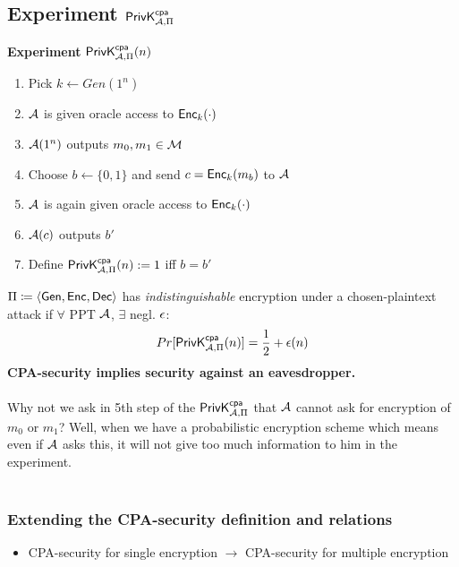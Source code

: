 \documentclass[12pt]{article}
\begin{document}
\subsection{ Experiment $\mathsf{PrivK}_{\mathcal{A},\Pi}^\mathsf{cpa}$}
\textbf{Experiment} $\mathsf{PrivK}_{\mathcal{A},\Pi}^\mathsf{cpa}(n)$
\begin{enumerate}
\item Pick $k \leftarrow Gen(1^n)$ 

\item $\mathcal{A}$ is given oracle access to $\operatorname{\mathsf{Enc}}_k(\cdot)$

\item $\mathcal{A}(1^n)$ outputs $m_0,m_1 \in \mathcal{M}$

\item Choose $b \leftarrow \{0,1\}$ and send $c = \operatorname{\mathsf{Enc}}_k(m_b)$ to $\mathcal{A}$

\item $\mathcal{A}$ is again given oracle access to $\operatorname{\mathsf{Enc}}_k(\cdot)$

 \item $\mathcal{A}(c)$ outputs $b'$

 \item Define $\mathsf{PrivK}_{\mathcal{A},\Pi}^\mathsf{cpa}(n):=1$ iff $b=b'$

\end{enumerate}
$\Pi \coloneqq \langle \operatorname{\mathsf{Gen}}, \operatorname{\mathsf{Enc}}, \operatorname{\mathsf{Dec}} \rangle $ has \emph{indistinguishable} encryption under a chosen-plaintext attack if $\forall$ PPT $\mathcal{A}$, $\exists$ negl. $\epsilon$:
\begin{equation*}
Pr[\mathsf{PrivK}_{\mathcal{A},\Pi}^\mathsf{cpa}(n)] = \frac{1}{2} + \epsilon(n)
\end{equation*}
\textbf{CPA-security implies security against an eavesdropper.}\\\\
Why not we ask in 5th step of the $\mathsf{PrivK}_{\mathcal{A},\Pi}^\mathsf{cpa}$ that $\mathcal{A}$ cannot ask for encryption of $m_0$ or $m_1$? Well, when we have a probabilistic encryption scheme which means even if $\mathcal{A}$ asks this, it will not give too much information to him in the experiment.\\\\

\subsubsection{Extending the CPA-security definition and relations}
\begin{itemize}
\item CPA-security for single encryption $\rightarrow$ CPA-security for multiple encryption
\end{itemize}
\end{document}
